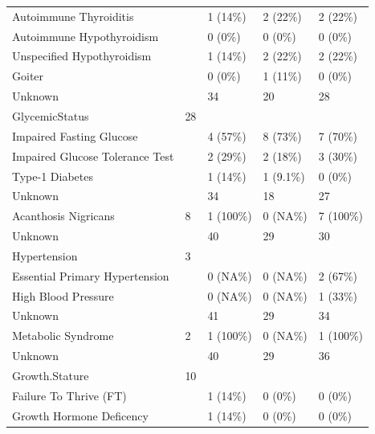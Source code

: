 \documentclass[
]{article}
\begin{document}
\begin{table}[!h]
\begin{tabular}[t]{lllll}
\hspace{1em}Autoimmune Thyroiditis &  & 1 (14\%) & 2 (22\%) & 2 (22\%)\\
\hspace{1em}Autoimmune Hypothyroidism &  & 0 (0\%) & 0 (0\%) & 0 (0\%)\\
\addlinespace
\hspace{1em}Unspecified Hypothyroidism &  & 1 (14\%) & 2 (22\%) & 2 (22\%)\\
\hspace{1em}Goiter &  & 0 (0\%) & 1 (11\%) & 0 (0\%)\\
\hspace{1em}Unknown &  & 34 & 20 & 28\\
GlycemicStatus & 28 &  &  & \\
\hspace{1em}Impaired Fasting Glucose &  & 4 (57\%) & 8 (73\%) & 7 (70\%)\\
\addlinespace
\hspace{1em}Impaired Glucose Tolerance Test &  & 2 (29\%) & 2 (18\%) & 3 (30\%)\\
\hspace{1em}Type-1 Diabetes &  & 1 (14\%) & 1 (9.1\%) & 0 (0\%)\\
\hspace{1em}Unknown &  & 34 & 18 & 27\\
Acanthosis Nigricans & 8 & 1 (100\%) & 0 (NA\%) & 7 (100\%)\\
\hspace{1em}Unknown &  & 40 & 29 & 30\\
\addlinespace
Hypertension & 3 &  &  & \\
\hspace{1em}Essential Primary Hypertension &  & 0 (NA\%) & 0 (NA\%) & 2 (67\%)\\
\hspace{1em}High Blood Pressure &  & 0 (NA\%) & 0 (NA\%) & 1 (33\%)\\
\hspace{1em}Unknown &  & 41 & 29 & 34\\
Metabolic Syndrome & 2 & 1 (100\%) & 0 (NA\%) & 1 (100\%)\\
\addlinespace
\hspace{1em}Unknown &  & 40 & 29 & 36\\
Growth.Stature & 10 &  &  & \\
\hspace{1em}Failure To Thrive (FT) &  & 1 (14\%) & 0 (0\%) & 0 (0\%)\\
\hspace{1em}Growth Hormone Deficency &  & 1 (14\%) & 0 (0\%) & 0 (0\%)\\

\end{tabular}
\end{table}
\end{document}
